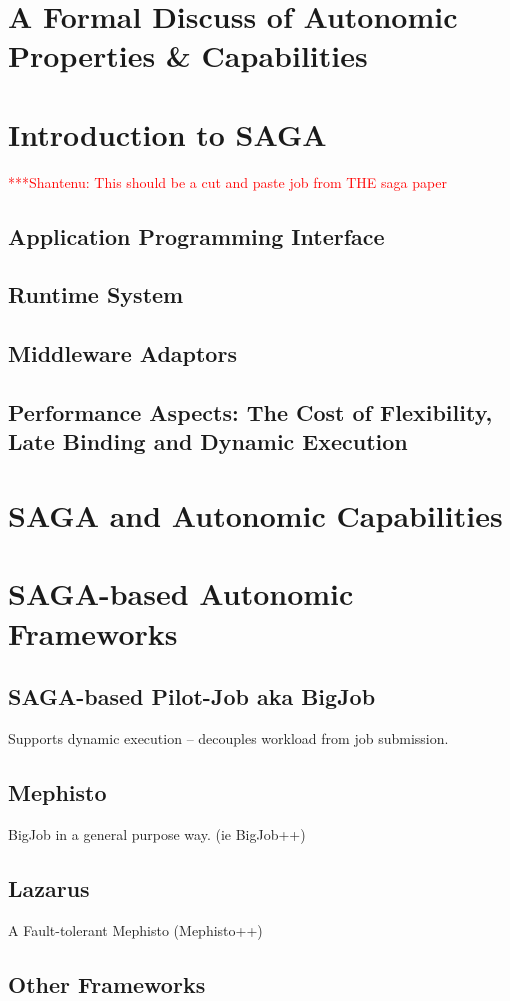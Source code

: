 \documentclass[a4paper,10pt]{article}
\newcommand{\jhanote}[1]{  {\textcolor{red}     { ***Shantenu: #1 }}}
\newcommand{\jhanote}[1]{}
\begin{document}
\section{A Formal Discuss of Autonomic Properties \& Capabilities}

\section{Introduction to SAGA}

\jhanote{This should be a cut and paste job from THE saga paper}

\subsection{Application Programming Interface}

\subsection{Runtime System}

\subsection{Middleware Adaptors}

\subsection{Performance Aspects: The Cost of Flexibility, Late Binding
  and Dynamic Execution}

\section{SAGA and Autonomic Capabilities}


\section{SAGA-based Autonomic Frameworks}

\subsection{SAGA-based Pilot-Job aka BigJob}

Supports dynamic execution -- decouples workload from job submission.

\subsection{Mephisto}

BigJob in a general purpose way. (ie BigJob++)

\subsection{Lazarus}

A Fault-tolerant Mephisto (Mephisto++)

\subsection{Other Frameworks}


  
 
\end{document}
